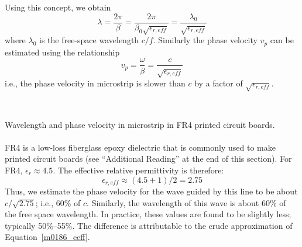 Using this concept, we obtain
%
\begin{equation}
\lambda = \frac{2\pi}{\beta} = \frac{2\pi}{\beta_0\sqrt{\epsilon_{r,eff}}} = \frac{\lambda_0}{\sqrt{\epsilon_{r,eff}}}
\end{equation}
%
where $\lambda_0$ is the free-space wavelength
$c/f$.
Similarly the phase velocity 
$v_p$ can be estimated using the relationship
%
\begin{equation}
v_p = \frac{\omega}{\beta} = \frac{c}{\sqrt{\epsilon_{r,eff}}}
\end{equation}
%
i.e., the phase velocity in microstrip is slower than $c$ by a factor of $\sqrt{\epsilon_{r,eff}}$.

~\\ \begin{example} 
\begin{mdframed}[backgroundcolor=brown!20,linecolor=brown!20]\raggedright
Wavelength and phase velocity in microstrip in FR4 
printed circuit boards.
\\~\\
FR4 is a low-loss fiberglass epoxy dielectric that is commonly used to make printed circuit boards (see ``Additional Reading'' at the end of this section).
For FR4, $\epsilon_r\approx 4.5$. 
The effective relative permittivity is therefore:
%
\begin{equation}
\epsilon_{r,eff}\approx(4.5+1)/2 = 2.75
\nonumber
\end{equation}
%
Thus, we estimate the phase velocity for the wave guided by this line to be about $c/\sqrt{2.75}$; i.e., 60\% of $c$.
Similarly, the wavelength of this wave is about 60\% of the free space wavelength.
In practice, these values are found to be slightly less; typically 50\%--55\%.
The difference is attributable to the crude approximation of Equation~\ref{m0186_eeff}.
\end{mdframed}\end{example}


